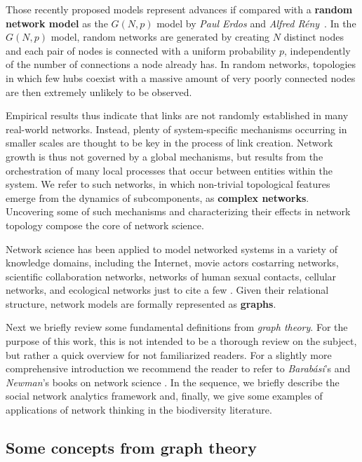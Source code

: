 Those recently proposed models represent advances if compared with a \textbf{random network model} as the $G(N,p)$ model by \textit{Paul Erdos} and \textit{Alfred Rény}~\cite{erdos1959random}. In the $G(N,p)$ model, 
random networks are generated by creating $N$ distinct nodes and each pair of nodes is connected with a uniform probability $p$, independently of the number of connections a node already has. 
In random networks, topologies in which few hubs coexist with a massive amount of very poorly connected nodes are then extremely unlikely to be observed. 


Empirical results thus indicate that links are not randomly established in many real-world networks.
Instead, plenty of system-specific mechanisms occurring in smaller scales are thought to be key in the process of link creation.
Network growth is thus not governed by a global mechanisms, but results from the orchestration of many local processes that occur between entities within the system.
We refer to such networks, in which non-trivial topological features emerge from the dynamics of subcomponents, as \textbf{complex networks}.
Uncovering some of such mechanisms and characterizing their effects in network topology compose the core of network science.


Network science has been applied to model networked systems in a variety of knowledge domains, including the Internet, movie actors costarring networks, scientific collaboration networks, networks of human sexual contacts, cellular networks, and ecological networks just to cite a few \cite{Albert2002}.
Given their relational structure, network models are formally represented as \textbf{graphs}.

Next we briefly review some fundamental definitions from \textit{graph theory}.
For the purpose of this work, this is not intended to be a thorough review on the subject, but rather a quick overview for not familiarized readers. 
For a slightly more comprehensive introduction we recommend the reader to refer to \textit{Barabási}'s and \textit{Newman}'s books on network science \cite{Barabasibook,Newman2010b}.
In the sequence, we briefly describe the social network analytics framework and, 
finally, we give some examples of applications of network thinking in the biodiversity literature.


\subsection{Some concepts from graph theory}
\label{section:graphtheory}

